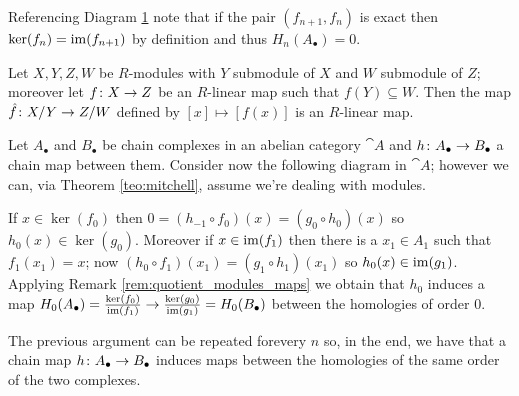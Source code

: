 \begin{figure}[h]
  \begin{center}
  \end{center}
  \caption{}
  \label{diagram:quotient}
\end{figure}

\begin{remark}
  \label{rem:exactness_and_homology}
  Referencing Diagram \ref{diagram:quotient} note that if the pair \((f_{n+1},f_{n})\) is exact then \(\ker(f_{n}) = \operatorname{im}(f_{n+1})\) by definition and thus \(H_n(A_\bullet) = 0\).
\end{remark}

\begin{remark}
  \label{rem:quotient_modules_maps}
  Let \(X,Y,Z,W\) be \(R\)-modules with \(Y\) submodule of \(X\) and \(W\) submodule of \(Z\); moreover let \(f\colon X\to Z\) be an \(R\)-linear map such that \(f(Y)\subseteq W\). Then the map \(\hat{f}\colon X/Y\to Z/W\) defined by \([x]\mapsto [f(x)]\) is an \(R\)-linear map.
\end{remark}

\begin{remark}
  \label{rem:induced_homology_maps}
  Let \(A_\bullet\) and \(B_\bullet\) be chain complexes in an abelian category \(\cat{A}\) and \(h\colon A_\bullet\to B_\bullet\) a chain map between them. Consider now the following diagram in \(\cat{A}\); however we can, via Theorem \ref{teo:mitchell}, assume we're dealing with modules.
    \begin{center}
  \end{center}
  If \(x\in\ker(f_0) \) then \(0 = (h_{-1}\circ f_0)(x) = (g_0\circ h_0)(x)\) so \(h_0(x)\in\ker(g_0)\). Moreover if \(x\in\operatorname{im}(f_1)\) then there is a \(x_1\in A_1\) such that \(f_1(x_1) = x\); now \((h_0\circ f_1)(x_1) = (g_1\circ h_1)(x_1)\) so \(h_0(x)\in\operatorname{im}(g_1)\). Applying Remark \ref{rem:quotient_modules_maps} we obtain that \(h_0\) induces a map \(H_0(A_\bullet)=\frac{\ker(f_0)}{\operatorname{im}(f_1)}\to\frac{\ker(g_0)}{\operatorname{im}(g_1)}=H_0(B_\bullet)\) between the homologies of order \(0\).

  The previous argument can be repeated forevery \(n\) so, in the end, we have that a chain map \(h\colon A_\bullet\to B_\bullet\) induces maps between the homologies of the same order of the two complexes.
\end{remark}

